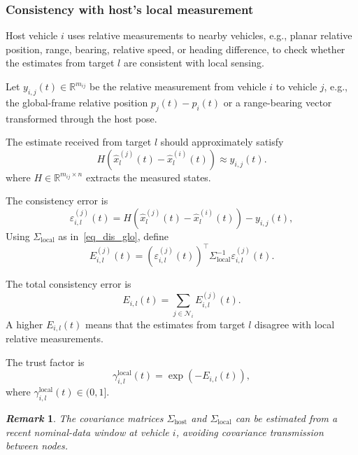 \documentclass[letterpaper,journal]{IEEEtran}
\def\N{\mathcal{N}} %
\newtheorem{remark}{\it Remark}%
\begin{document}
\subsubsection{Consistency with host's local measurement}
Host vehicle $i$ uses relative measurements to nearby vehicles, e.g., planar relative position, range, bearing, relative speed, or heading difference, to check whether the estimates from target $l$ are consistent with local sensing.

Let $y_{i,j}(t) \in \mathbb{R}^{m_{ij}}$ be the relative measurement from vehicle $i$ to vehicle $j$, e.g., the global-frame relative position $p_j(t)-p_i(t)$ or a range-bearing vector transformed through the host pose.

The estimate received from target $l$ should approximately satisfy
\begin{equation*}
    H(\hat{x}_l^{(j)}(t) - \hat{x}_l^{(i)}(t)) \approx y_{i,j}(t).
\end{equation*}
where $H \in \mathbb{R}^{m_{ij} \times n}$ extracts the measured states.

The consistency error is
\begin{equation}
    \varepsilon_{i,l}^{(j)}(t) = H\left( \hat{x}_l^{(j)}(t) - \hat{x}_l^{(i)}(t) \right) - y_{i,j}(t),
\end{equation}
Using $\Sigma_{\text{local}}$ as in~\eqref{eq_dis_glo}, define
\begin{equation}
    E_{i,l}^{(j)}(t) = (\varepsilon_{i,l}^{(j)}(t))^{\top} \Sigma_{\text{local}}^{-1} \varepsilon_{i,l}^{(j)}(t).
\end{equation}

The total consistency error is
\begin{equation}
    E_{i,l}(t) = \sum_{j \in \N_i} E_{i,l}^{(j)}(t).
\end{equation}
A higher $E_{i,l}(t)$ means that the estimates from target $l$ disagree with local relative measurements.

The trust factor is
\begin{equation}
    \gamma_{i,l}^{\text{local}}(t) = \exp\left( -{E_{i,l}(t)} \right),
\end{equation}
where $\gamma_{i,l}^{\text{local}}(t) \in (0, 1]$.
\begin{remark}
The covariance matrices $\Sigma_{\text{host}}$ and $\Sigma_{\text{local}}$ can be estimated from a recent nominal-data window at vehicle \(i\), avoiding covariance transmission between nodes.
\end{remark}
\end{document}
